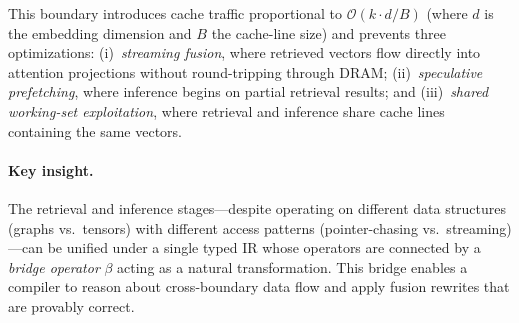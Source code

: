 \documentclass{article}
\theoremstyle{definition}
\theoremstyle{remark}
\newcommand{\BigO}{\mathcal{O}}
\begin{document}
This boundary introduces cache traffic proportional to $\BigO(k \cdot d / B)$ (where $d$ is the embedding dimension and $B$ the cache-line size) and prevents three optimizations:
(i)~\emph{streaming fusion}, where retrieved vectors flow directly into attention projections without round-tripping through DRAM;
(ii)~\emph{speculative prefetching}, where inference begins on partial retrieval results; and
(iii)~\emph{shared working-set exploitation}, where retrieval and inference share cache lines containing the same vectors.

\paragraph{Key insight.}
The retrieval and inference stages---despite operating on different data structures (graphs vs.\ tensors) with different access patterns (pointer-chasing vs.\ streaming)---can be unified under a single typed IR whose operators are connected by a \emph{bridge operator} $\beta$ acting as a natural transformation.
This bridge enables a compiler to reason about cross-boundary data flow and apply fusion rewrites that are provably correct.
\end{document}
